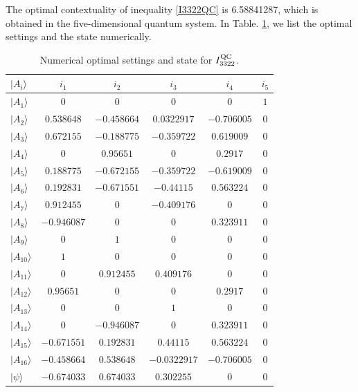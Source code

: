 \documentclass[pra,aps,notitlepage,superscriptaddress,showpacs,showkeys]{revtex4-1}
\theoremstyle{definition}
\theoremstyle{remark}
\begin{document}
The optimal contextuality of inequality \eqref{I3322QC} is 6.58841287, which is obtained in the 
five-dimensional quantum system. In Table. \ref{numerical}, we list 
the optimal settings and the state numerically. 
\begin{table}[h]
\centering
  \begin{tabular}{lccccc} \hline \hline
$|A_i\rangle$ & $i_1$ & $i_2$ & $i_3$ & $i_4$ & $i_5$ \\
\hline
$|A_1\rangle$  & $0$ & $0$ & $0$ & $0$ & $1$ \\
$|A_2\rangle$  & $0.538648$ & $-0.458664$ & $0.0322917$ & $-0.706005$ & $0$ \\
$|A_3\rangle$  & $0.672155$ & $-0.188775$ & $-0.359722$ & $0.619009$ & $0$ \\
$|A_4\rangle$  & $0$ & $0.95651$ & $0$ & $0.2917$ & $0$ \\
$|A_5\rangle$  & $0.188775$ & $-0.672155$ & $-0.359722$ & $-0.619009$ & $0$ \\
$|A_6\rangle$  & $0.192831$ & $-0.671551$ & $-0.44115$ & $0.563224$ & $0$ \\
$|A_7\rangle$  & $0.912455$ & $0$ & $-0.409176$ & $0$ & $0$ \\
$|A_8\rangle$  & $-0.946087$ & $0$ & $0$ & $0.323911$ & $0$ \\
$|A_9\rangle$  & $0$ & $1$ & $0$ & $0$ & $0$ \\
$|A_{10}\rangle$ & $1$ & $0$ & $0$ & $0$ & $0$ \\
$|A_{11}\rangle$ & $0$ & $0.912455$ & $0.409176$ & $0$ & $0$ \\
$|A_{12}\rangle$ & $0.95651$ & $0$ & $0$ & $0.2917$ & $0$ \\
$|A_{13}\rangle$ & $0$ & $0$ & $1$ & $0$ & $0$ \\
$|A_{14}\rangle$ & $0$ & $-0.946087$ & $0$ & $0.323911$ & $0$ \\
$|A_{15}\rangle$ & $-0.671551$ & $0.192831$ & $0.44115$ & $0.563224$ & $0$ \\
$|A_{16}\rangle$ & $-0.458664$ & $0.538648$ & $-0.0322917$ & $-0.706005$ & $0$ \\
\hline
$|\psi\rangle$ & $-0.674033$ & $0.674033$ & $0.302255$ & $0$ & $0$\\
  \hline \hline
   \end{tabular}
\caption{Numerical optimal settings and state for $I_{3322}^{\rm QC}$.}
\label{numerical}
\end{table}
\end{document}
